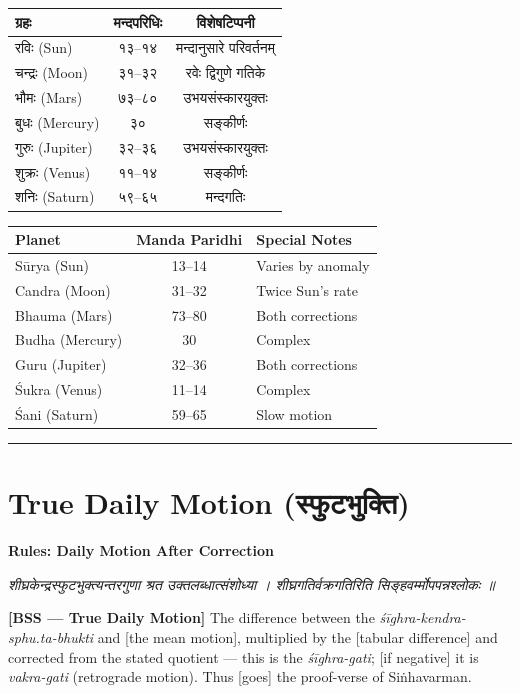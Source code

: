 \documentclass[11pt,a4paper]{book}
\newcommand{\dev}[1]{{\devanagarifont #1}}
\newcommand{\bilingual}[2]{%
  \par\vspace{0.6em}%
  \noindent\begin{minipage}[t]{0.48\textwidth}
    \RaggedRight
    #1%
  \end{minipage}%
  \hfill
  \begin{minipage}[t]{0.48\textwidth}
    \RaggedRight
    #2%
  \end{minipage}%
  \par\vspace{0.6em}%
}
\newcommand{\shlokabilingual}[2]{%
  \par\vspace{0.8em}%
  \noindent\begin{minipage}[t]{0.48\textwidth}
    \RaggedRight
    \dev{\textit{#1}}
  \end{minipage}%
  \hfill
  \begin{minipage}[t]{0.48\textwidth}
    \RaggedRight
    #2%
  \end{minipage}%
  \par\vspace{0.8em}%
}
\newcommand{\ruleheadingbilingual}[2]{%
  \par\vspace{0.8em}%
  \noindent\begin{minipage}[t]{0.48\textwidth}
    \textbf{\color{sectioncolor}\dev{#1}}
  \end{minipage}%
  \hfill
  \begin{minipage}[t]{0.48\textwidth}
    \textbf{\color{sectioncolor}#2}
  \end{minipage}%
  \par\vspace{0.4em}%
}
\newcommand{\secdivider}{%
  \begin{center}\rule{0.4\textwidth}{0.5pt}\end{center}%
}
\begin{document}
\bilingual{%
\begin{tabular}{|l|c|c|}
\hline
\textbf{ग्रहः} & \textbf{मन्दपरिधिः} & \textbf{विशेषटिप्पनी} \\
\hline
रविः (Sun) & १३--१४ & मन्दानुसारे परिवर्तनम्‌ \\
चन्द्रः (Moon) & ३१--३२ & रवेः द्विगुणे गतिके \\
भौमः (Mars) & ७३--८० & उभयसंस्कारयुक्तः \\
बुधः (Mercury) & ३० & सङ्कीर्णः \\
गुरुः (Jupiter) & ३२--३६ & उभयसंस्कारयुक्तः \\
शुक्रः (Venus) & ११--१४ & सङ्कीर्णः \\
शनिः (Saturn) & ५९--६५ & मन्दगतिः \\
\hline
\end{tabular}
}{%
\begin{tabular}{|l|c|l|}
\hline
\textbf{Planet} & \textbf{Manda Paridhi} & \textbf{Special Notes} \\
\hline
Sūrya (Sun) & 13--14 & Varies by anomaly \\
Candra (Moon) & 31--32 & Twice Sun's rate \\
Bhauma (Mars) & 73--80 & Both corrections \\
Budha (Mercury) & 30 & Complex \\
Guru (Jupiter) & 32--36 & Both corrections \\
Śukra (Venus) & 11--14 & Complex \\
Śani (Saturn) & 59--65 & Slow motion \\
\hline
\end{tabular}
}

\secdivider
\clearpage

\section{True Daily Motion (\dev{स्फुटभुक्ति})}

\ruleheadingbilingual{नियमाः स्फुटभुक्तिः}{Rules: Daily Motion After Correction}

\shlokabilingual{%
शीघ्रकेन्द्रस्फुटभुक्त्यन्तरगुणा श्रत उक्तलब्धात्संशोध्या ।
शीघ्रगतिर्वक्रगतिरिति सिङ्हवर्म्मोपपन्नश्लोकः ॥
}{%
\textbf{[BSS --- True Daily Motion]} The difference between the \textit{śīghra-kendra-sphu.ta-bhukti} and [the mean motion], multiplied by the [tabular difference] and corrected from the stated quotient --- this is the \textit{śīghra-gati}; [if negative] it is \textit{vakra-gati} (retrograde motion). Thus [goes] the proof-verse of Siṅhavarman.
}
\end{document}
